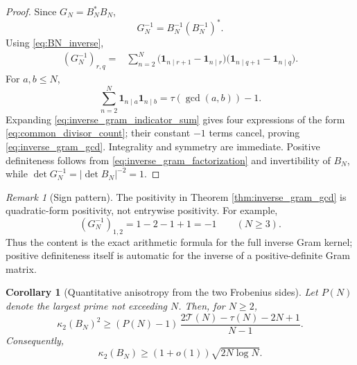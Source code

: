 \documentclass[11pt]{amsart}
\numberwithin{equation}{section}
\theoremstyle{plain}
\newtheorem{corollary}[theorem]{Corollary}
\theoremstyle{definition}
\theoremstyle{remark}
\newtheorem{remark}[theorem]{Remark}
\newcommand{\one}{\mathbf 1}
\newcommand{\TauSum}{\mathcal T}
\begin{document}
\begin{proof}
Since $G_N=B_N^*B_N$,
\begin{equation}
G_N^{-1}=B_N^{-1}(B_N^{-1})^*.
\label{eq:inverse_gram_factorization}
\end{equation}
Using \eqref{eq:BN_inverse},
\begin{align}
(G_N^{-1})_{r,q}
={}&\sum_{n=2}^{N}
\bigl(\one_{n\mid r+1}-\one_{n\mid r}\bigr)
\bigl(\one_{n\mid q+1}-\one_{n\mid q}\bigr).
\label{eq:inverse_gram_indicator_sum}
\end{align}
For $a,b\le N$,
\begin{equation}
\sum_{n=2}^{N}\one_{n\mid a}\one_{n\mid b}
=\tau(\gcd(a,b))-1.
\label{eq:common_divisor_count}
\end{equation}
Expanding \eqref{eq:inverse_gram_indicator_sum} gives four expressions of the form \eqref{eq:common_divisor_count}; their constant $-1$ terms cancel, proving \eqref{eq:inverse_gram_gcd}.  Integrality and symmetry are immediate.  Positive definiteness follows from \eqref{eq:inverse_gram_factorization} and invertibility of $B_N$, while
$\det G_N^{-1}=|\det B_N|^{-2}=1$.
\end{proof}

\begin{remark}[Sign pattern]
\label{rem:inverse_gram_sign}
The positivity in Theorem \ref{thm:inverse_gram_gcd} is quadratic-form positivity, not entrywise positivity.  For example,
\begin{equation}
(G_N^{-1})_{1,2}=1-2-1+1=-1
\qquad(N\ge3).
\label{eq:inverse_gram_negative_entry}
\end{equation}
Thus the content is the exact arithmetic formula for the full inverse Gram kernel; positive definiteness itself is automatic for the inverse of a positive-definite Gram matrix.
\end{remark}

\begin{corollary}[Quantitative anisotropy from the two Frobenius sides]
\label{cor:condition_number_growth}
Let $P(N)$ denote the largest prime not exceeding $N$.  Then, for $N\ge2$,
\begin{equation}
\kappa_2(B_N)^2
\ge
(P(N)-1)\,
\frac{2\TauSum(N)-\tau(N)-2N+1}{N-1}.
\label{eq:condition_number_exact_lower}
\end{equation}
Consequently,
\begin{equation}
\kappa_2(B_N)
\ge (1+o(1))\sqrt{2N\log N}.
\label{eq:condition_number_lower}
\end{equation}
\end{corollary}
\end{document}

